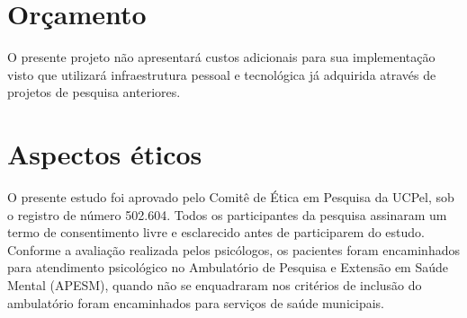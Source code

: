\documentclass[chapter=TITLE,
               oneside,
               12pt,
               a4paper,
               english,
               brazil]{abntex2}    %
\begin{document}
\section{Orçamento}\label{sec:orcamento}

    O presente projeto não apresentará custos adicionais para sua implementação
    visto que utilizará infraestrutura pessoal e tecnológica já adquirida através
    de projetos de pesquisa anteriores.

\section{Aspectos éticos}\label{sec:aspectoseticos}

    O presente estudo foi aprovado pelo Comitê de Ética em Pesquisa da UCPel,
    sob o registro de número 502.604. Todos os participantes da pesquisa assinaram
    um termo de consentimento livre e esclarecido antes de participarem do estudo.
    Conforme a avaliação realizada pelos psicólogos, os pacientes foram encaminhados
    para atendimento psicológico no Ambulatório de Pesquisa e Extensão em Saúde Mental
    (APESM), quando não se enquadraram nos critérios de inclusão do ambulatório foram
    encaminhados para serviços de saúde municipais.

\endgroup

\postextual

\printbibliography

\anexos
\end{document}
